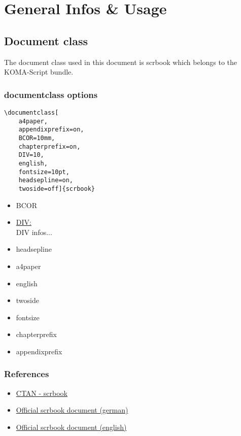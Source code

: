 \section{General Infos \& Usage}
\subsection{Document class}
The document class used in this document is scrbook which belongs to the
KOMA-Script bundle.
\subsubsection{documentclass options}
\begin{singlespace}
\begin{lstlisting}[style=cstm-lists-latex-sty]
\documentclass[
    a4paper,
    appendixprefix=on,
    BCOR=10mm,
    chapterprefix=on,
    DIV=10,
    english,
    fontsize=10pt,
    headsepline=on,
    twoside=off]{scrbook}
\end{lstlisting}
\end{singlespace}
\begin{itemize}
    \item{BCOR}
    \item{\href{http://mirrors.ibiblio.org/CTAN/macros/latex/contrib/koma-script/doc/scrguide.pdf\#desc:typearea.option.DIV}{DIV:}\\
        DIV infos...}
    \item{headsepline}
    \item{a4paper}
    \item{english}
    \item{twoside}
    \item{fontsize}
    \item{chapterprefix}
    \item{appendixprefix}
\end{itemize}
\subsubsection{References}
\begin{itemize}
    \item{\href{https://ctan.org/pkg/scrbook}{CTAN - scrbook}}
    \item{\href{http://www.pirbot.com/mirrors/ctan/macros/latex/contrib/koma-script/doc/scrguide.pdf}{Official scrbook document (german)}}
    \item{\href{http://www.pirbot.com/mirrors/ctan/macros/latex/contrib/koma-script/doc/scrguien.pdf}{Official scrbook document (english)}}
\end{itemize}
\onehalfspacing

